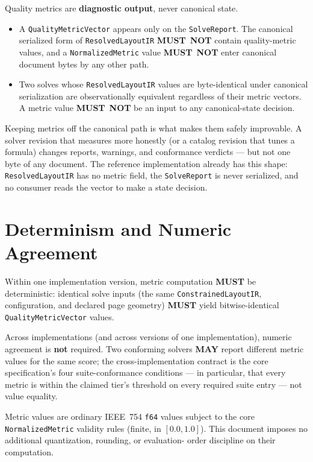 \documentclass[11pt,letterpaper]{report}
\newcounter{requirement}[chapter]
\newcommand{\MUST}{\textbf{MUST}}
\newcommand{\MUSTNOT}{\textbf{MUST}\nobreak\ \textbf{NOT}}
\newcommand{\MAY}{\textbf{MAY}}
\begin{document}
\begin{requirement}
\label{req:qmc:diagnostic}
Quality metrics are \textbf{diagnostic output}, never canonical state.

\begin{itemize}
  \item A \texttt{QualityMetricVector} appears only on the
    \texttt{SolveReport}. The canonical serialized form of
    \texttt{ResolvedLayoutIR} \MUSTNOT{} contain quality-metric values,
    and a \texttt{NormalizedMetric} value \MUSTNOT{} enter canonical
    document bytes by any other path.
  \item Two solves whose \texttt{ResolvedLayoutIR} values are
    byte-identical under canonical serialization are observationally
    equivalent regardless of their metric vectors. A metric value
    \MUSTNOT{} be an input to any canonical-state decision.
\end{itemize}
\end{requirement}

\begin{rationale}
Keeping metrics off the canonical path is what makes them safely
improvable. A solver revision that measures more honestly (or a catalog
revision that tunes a formula) changes reports, warnings, and conformance
verdicts --- but not one byte of any document. The reference implementation
already has this shape: \texttt{ResolvedLayoutIR} has no metric field, the
\texttt{SolveReport} is never serialized, and no consumer reads the vector
to make a state decision.
\end{rationale}

\section{Determinism and Numeric Agreement}
\label{sec:model:determinism}

\begin{requirement}
\label{req:qmc:determinism}
Within one implementation version, metric computation \MUST{} be
deterministic: identical solve inputs (the same
\texttt{ConstrainedLayoutIR}, configuration, and declared page geometry)
\MUST{} yield bitwise-identical \texttt{QualityMetricVector} values.

Across implementations (and across versions of one implementation),
numeric agreement is \textbf{not} required. Two conforming solvers \MAY{}
report different metric values for the same score; the
cross-implementation contract is the core specification's four
suite-conformance conditions --- in particular, that every metric is within
the claimed tier's threshold on every required suite entry --- not value
equality.

Metric values are ordinary IEEE~754 \texttt{f64} values subject to the
core \texttt{NormalizedMetric} validity rules (finite, in $[0.0, 1.0]$).
This document imposes no additional quantization, rounding, or evaluation-
order discipline on their computation.
\end{requirement}
\end{document}
